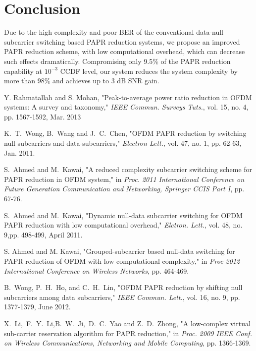 \documentclass[journal,comsoc]{IEEEtran}
\begin{document}
\section{Conclusion}
 Due to the high complexity and poor BER of the conventional data-null subcarrier switching based PAPR reduction systems, we propose an improved PAPR reduction scheme, with low computational overhead, which can decrease such effects dramatically. Compromising only 9.5\% of the PAPR reduction capability at $10^{-3}$ CCDF level, our system reduces the system complexity by more than 98\% and achieves up to 3 dB SNR gain.














\ifCLASSOPTIONcaptionsoff
  \newpage
\fi

\begin{thebibliography}{1}

Y. Rahmatallah and S. Mohan, "Peak-to-average power ratio reduction in OFDM systems: A survey and taxonomy," \emph{IEEE Commun. Surveys Tuts.}, vol. 15, no. 4, pp. 1567-1592, Mar. 2013

K.~T.~Wong, B.~Wang and J.~C.~Chen, "OFDM PAPR reduction by switching null subcarriers and data-subcarriers," \emph{Electron Lett.},
        vol. 47, no. 1, pp. 62-63, Jan. 2011.

S.~Ahmed and M.~Kawai, "A reduced complexity subcarrier switching scheme for PAPR reduction in OFDM system," in \emph{Proc. 2011 International Conference on Future Generation Communication and Networking, Springer CCIS Part I}, pp. 67-76.

S.~Ahmed and M.~Kawai, "Dynamic null-data subcarrier switching for OFDM PAPR reduction with low computational overhead,"
\emph{Elctron. Lett.}, vol. 48, no. 9,pp. 498-499, April 2011.

S. Ahmed and M. Kawai, "Grouped-subcarrier based null-data switching for PAPR reduction of OFDM with low computational complexity," in \emph{Proc 2012 International Conference on Wireless Networks}, pp. 464-469.

B.~Wong, P.~H.~Ho, and C.~H.~Lin, "OFDM PAPR reduction by shifting null subcarriers among data subcarriers," \emph{IEEE Commun. Lett.}, vol. 16, no. 9, pp. 1377-1379, June 2012.

X.~Li,~F.~Y.~Li,B.~W.~Ji,~D.~C.~Yao and Z.~D.~Zhong, "A low-complex virtual sub-carrier reservation algorithm for PAPR reduction," in \emph{Proc. 2009 IEEE Conf. on Wireless Communications, Networking and Mobile Computing}, pp. 1366-1369.

\end{thebibliography}
\end{document}
